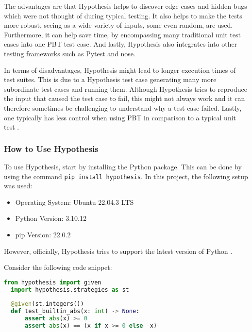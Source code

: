 \documentclass[runningheads]{llncs}
\begin{document}
The advantages are that Hypothesis helps to discover edge cases and hidden bugs which were not thought of during typical testing. It also helps to make the tests more robust, seeing as a wide variety of inputs, some even random, are used.
Furthermore, it can help save time, by encompassing many traditional unit test cases into one PBT test case. And lastly, Hypothesis also integrates into other testing frameworks such as Pytest and nose.

In terms of disadvantages, Hypothesis might lead to longer execution times of test suites. This is due to a Hypothesis test case generating many more subordinate test cases and running them. Although Hypothesis tries to reproduce the input that caused the test case to fail, this might not always work and it can therefore sometimes be challenging to understand why a test case failed.
Lastly, one typically has less control when using PBT in comparison to a typical unit test \cite{HypothesisDocs}.

\subsubsection{How to Use Hypothesis}
To use Hypothesis, start by installing the Python package. This can be done by using the command \texttt{pip install hypothesis}. In this project, the following setup was used:

\begin{itemize}
  \item Operating System: Ubuntu 22.04.3 LTS
  \item Python Version: 3.10.12
  \item pip Version: 22.0.2
\end{itemize}


However, officially, Hypothesis tries to support the latest version of Python \cite{HypothesisDocs}.


Consider the following code snippet:
\begin{lstlisting}[language=Python]
  from hypothesis import given
  import hypothesis.strategies as st
  
  @given(st.integers())
  def test_builtin_abs(x: int) -> None:
      assert abs(x) >= 0
      assert abs(x) == (x if x >= 0 else -x)
\end{lstlisting}
\end{document}
